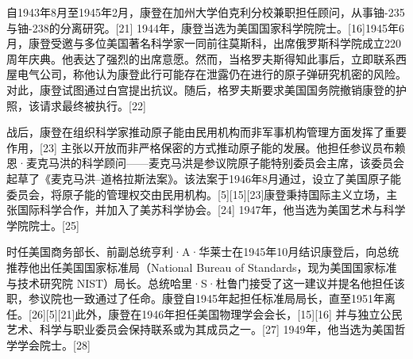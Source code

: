 自1943年8月至1945年2月，康登在加州大学伯克利分校兼职担任顾问，从事铀-235与铀-238的分离研究。[21] 1944年，康登当选为美国国家科学院院士。[16]1945年6月，康登受邀与多位美国著名科学家一同前往莫斯科，出席俄罗斯科学院成立220周年庆典。他表达了强烈的出席意愿。然而，当格罗夫斯得知此事后，立即联系西屋电气公司，称他认为康登此行可能存在泄露仍在进行的原子弹研究机密的风险。对此，康登试图通过白宫提出抗议。随后，格罗夫斯要求美国国务院撤销康登的护照，该请求最终被执行。[22]

战后，康登在组织科学家推动原子能由民用机构而非军事机构管理方面发挥了重要作用，[23] 主张以开放而非严格保密的方式推动原子能的发展。他担任参议员布赖恩·麦克马洪的科学顾问——麦克马洪是参议院原子能特别委员会主席，该委员会起草了《麦克马洪–道格拉斯法案》。该法案于1946年8月通过，设立了美国原子能委员会，将原子能的管理权交由民用机构。[5][15][23]康登秉持国际主义立场，主张国际科学合作，并加入了美苏科学协会。[24] 1947年，他当选为美国艺术与科学学院院士。[25]

时任美国商务部长、前副总统亨利·A·华莱士在1945年10月结识康登后，向总统推荐他出任美国国家标准局（National Bureau of Standards，现为美国国家标准与技术研究院 NIST）局长。总统哈里·S·杜鲁门接受了这一建议并提名他担任该职，参议院也一致通过了任命。康登自1945年起担任标准局局长，直至1951年离任。[26][5][21]此外，康登在1946年担任美国物理学会会长，[15][16] 并与独立公民艺术、科学与职业委员会保持联系或为其成员之一。[27] 1949年，他当选为美国哲学学会院士。[28]
